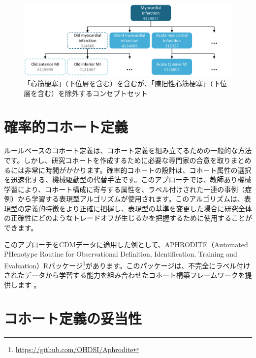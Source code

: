 \documentclass[
  11pt]{book}
\theoremstyle{definition}
\theoremstyle{definition}
\theoremstyle{definition}
\theoremstyle{definition}
\theoremstyle{remark}
\begin{document}
\begin{figure}

{\centering \includegraphics[width=1\linewidth]{images/Cohorts/conceptSet} 

}

\caption{「心筋梗塞」（下位層を含む）を含むが、「陳旧性心筋梗塞」（下位層を含む）を除外するコンセプトセット}\label{fig:conceptSet}
\end{figure}

\section{確率的コホート定義}\label{ux78baux7387ux7684ux30b3ux30dbux30fcux30c8ux5b9aux7fa9}

ルールベースのコホート定義は、コホート定義を組み立てるための一般的な方法です。しかし、研究コホートを作成するために必要な専門家の合意を取りまとめるには非常に時間がかかります。確率的コホートの設計は、コホート属性の選択を迅速化する、機械駆動型の代替手法です。このアプローチでは、教師あり機械学習により、コホート構成に寄与する属性を、ラベル付けされた一連の事例（症例）から学習する表現型アルゴリズムが使用されます。このアルゴリズムは、表現型の定義的特徴をより正確に把握し、表現型の基準を変更した場合に研究全体の正確性にどのようなトレードオフが生じるかを把握するために使用することができます。 

このアプローチをCDMデータに適用した例として、APHRODITE（Automated PHenotype Routine for Observational Definition, Identification, Training and Evaluation）Rパッケージ\footnote{\url{https://github.com/OHDSI/Aphrodite}}があります。このパッケージは、不完全にラベル付けされたデータから学習する能力を組み合わせたコホート構築フレームワークを提供します \citep{Banda2017APHRODITE} 。

\section{コホート定義の妥当性}\label{ux30b3ux30dbux30fcux30c8ux5b9aux7fa9ux306eux59a5ux5f53ux6027}
\end{document}
